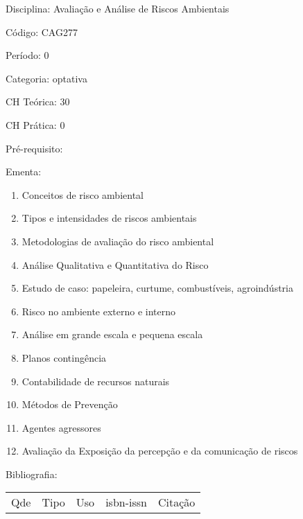 \documentclass[12pt,a4paper,twoside]{report}
\begin{document}
Disciplina: Avaliação e Análise de Riscos Ambientais

Código: CAG277

Período: 0

Categoria: optativa

CH Teórica: 30

CH Prática: 0




Pré-requisito:
\begin{enumerate}
\end{enumerate}

Ementa:
\begin{enumerate}
\item Conceitos de risco ambiental
\item Tipos e intensidades de riscos ambientais
\item Metodologias de avaliação do risco ambiental
\item Análise Qualitativa e Quantitativa do Risco
\item Estudo de caso: papeleira, curtume, combustíveis, agroindústria
\item Risco no ambiente externo e interno
\item Análise em grande escala e pequena escala
\item Planos contingência
\item Contabilidade de recursos naturais
\item Métodos de Prevenção
\item Agentes agressores
\item Avaliação da Exposição da percepção e da comunicação de riscos
\end{enumerate}



Bibliografia:


\begin{tabular}{llllp{8cm}}
Qde & Tipo & Uso & isbn-issn & Citação \\
\end{tabular}
\end{document}
